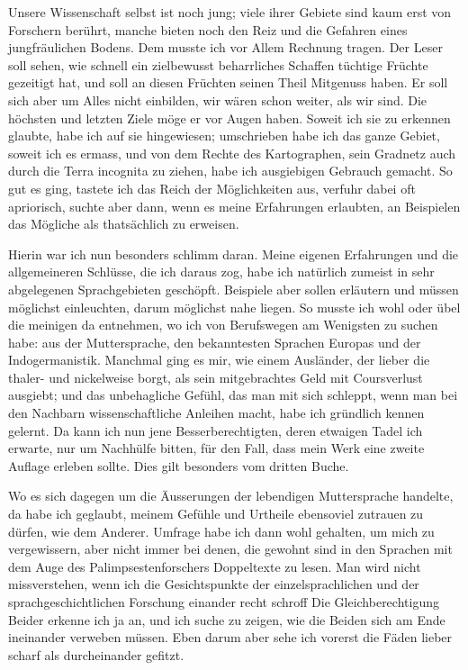 Unsere Wissenschaft selbst ist noch jung; viele ihrer Gebiete sind kaum erst von Forschern berührt, manche bieten noch den Reiz und die Gefahren eines jungfräulichen Bodens. Dem musste ich vor Allem Rechnung tragen. Der Leser soll sehen, wie schnell ein zielbewusst beharrliches Schaffen tüchtige Früchte gezeitigt hat, und soll an diesen Früchten seinen Theil Mitgenuss haben. Er soll sich aber um Alles nicht einbilden, wir wären schon weiter, als wir sind. Die höchsten und letzten Ziele möge er vor Augen haben. Soweit ich sie zu erkennen glaubte, habe ich auf sie hingewiesen; umschrieben habe ich das ganze Gebiet, soweit ich es ermass, und von dem Rechte des Kartographen, sein Gradnetz auch durch die Terra incognita zu ziehen, habe ich ausgiebigen Gebrauch gemacht. So gut es ging, tastete ich das Reich der Möglichkeiten aus, verfuhr dabei oft apriorisch, suchte aber dann, wenn es meine Erfahrungen erlaubten, an Beispielen das Mögliche als thatsächlich zu erweisen.

Hierin war ich nun besonders schlimm daran. Meine eigenen Erfahrungen und die allgemeineren Schlüsse, die ich daraus zog, habe ich natürlich zumeist in sehr abgelegenen Sprachgebieten geschöpft. Beispiele aber sollen erläutern und müssen möglichst einleuchten, darum möglichst nahe liegen. So musste ich wohl oder übel die meinigen da entnehmen, wo ich von Berufswegen am Wenigsten zu suchen habe: aus der Muttersprache, den bekanntesten Sprachen Europas und der Indogermanistik. Manchmal ging es mir, wie einem Ausländer, der lieber die  thaler- und nickelweise borgt, als sein mitgebrachtes Geld mit Coursverlust ausgiebt; und das unbehagliche Gefühl, das man mit sich schleppt, wenn man bei den Nachbarn wissenschaftliche Anleihen macht, habe ich gründlich kennen gelernt. Da kann ich nun jene Besserberechtigten, deren etwaigen Tadel ich erwarte, nur um  Nachhülfe bitten, für den Fall, dass mein Werk eine zweite Auflage erleben sollte. Dies gilt besonders vom dritten Buche.


Wo es sich dagegen um die Äusserungen der lebendigen Muttersprache handelte, da habe ich geglaubt, meinem Gefühle und Urtheile ebensoviel zutrauen zu dürfen, wie dem Anderer. Umfrage habe ich dann wohl gehalten, um mich zu vergewissern, aber nicht immer bei denen, die gewohnt sind in den Sprachen mit dem Auge des Palimpsestenforschers Doppeltexte zu lesen. Man wird  nicht missverstehen, wenn ich die Gesichtspunkte der einzelsprachlichen und der sprachgeschichtlichen Forschung einander recht schroff  Die Gleichberechtigung Beider erkenne ich ja an, und ich suche zu zeigen, wie die Beiden sich am Ende ineinander verweben müssen. Eben darum aber sehe ich vorerst die Fäden lieber scharf  als durcheinander gefitzt.

